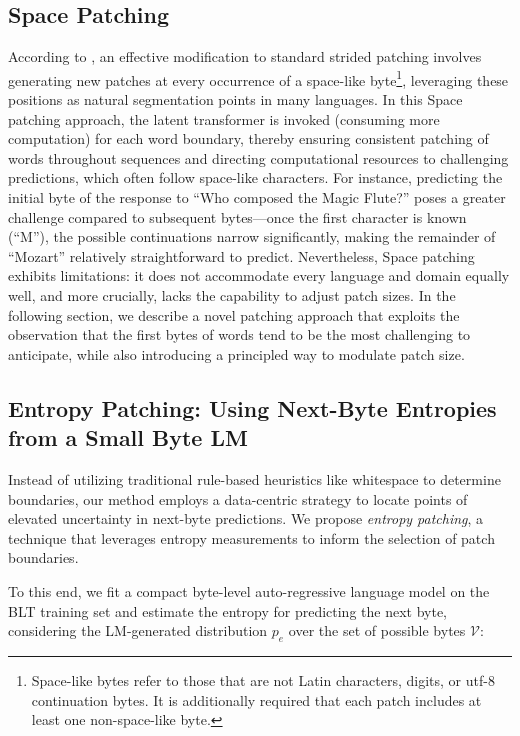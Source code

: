 \subsection{Space Patching}
\label{section:white-patch}

According to \citet{slagle2024spacebyte}, an effective modification to standard strided patching involves generating new patches at every occurrence of a space-like byte\footnote{
    Space-like bytes refer to those that are not Latin characters, digits, or utf-8 continuation bytes. It is additionally required that each patch includes at least one non-space-like byte.}, leveraging these positions as natural segmentation points in many languages. In this Space patching approach, the latent transformer is invoked (consuming more computation) for each word boundary, thereby ensuring consistent patching of words throughout sequences and directing computational resources to challenging predictions, which often follow space-like characters. For instance, predicting the initial byte of the response to ``Who composed the Magic Flute?\uline{\hspace{.6em}}'' poses a greater challenge compared to subsequent bytes—once the first character is known (``M''), the possible continuations narrow significantly, making the remainder of ``Mozart'' relatively straightforward to predict. Nevertheless, Space patching exhibits limitations: it does not accommodate every language and domain equally well, and more crucially, lacks the capability to adjust patch sizes. In the following section, we describe a novel patching approach that exploits the observation that the first bytes of words tend to be the most challenging to anticipate, while also introducing a principled way to modulate patch size.

\subsection{Entropy Patching: Using Next-Byte Entropies from a Small Byte LM}
\label{section:dyn-patch}

Instead of utilizing traditional rule-based heuristics like whitespace to determine boundaries, our method employs a data-centric strategy to locate points of elevated uncertainty in next-byte predictions. We propose \textit{entropy patching}, a technique that leverages entropy measurements to inform the selection of patch boundaries.

To this end, we fit a compact byte-level auto-regressive language model on the {\textsc BLT} training set and estimate the entropy for predicting the next byte, considering the LM-generated distribution $p_{e}$ over the set of possible bytes $\mathcal{V}$:

